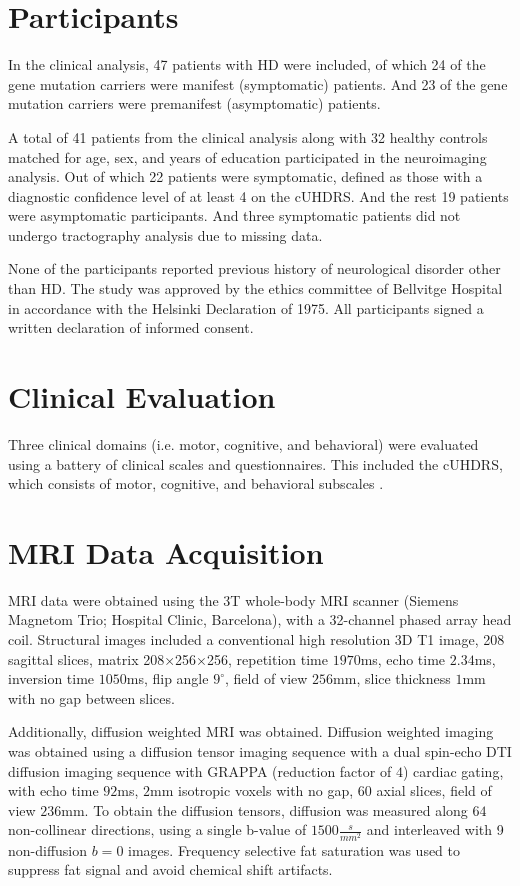 \label{sec:previous}

\section{Participants}

In the clinical analysis, 47 patients with \ac{HD} were included, of which 24 of the gene mutation carriers were manifest (symptomatic) patients. And 23 of the gene mutation carriers were premanifest (asymptomatic) patients.\par
A total of 41 patients from the clinical analysis along with 32 healthy controls matched for age, sex, and years of education participated in the neuroimaging analysis. Out of which 22 patients were symptomatic, defined as those with a diagnostic confidence level of at least 4 on the \ac{cUHDRS}. And the rest 19 patients were asymptomatic participants. And three symptomatic patients did not undergo tractography analysis due to missing data.\par
None of the participants reported previous history of neurological disorder other than \ac{HD}. The study was approved by the ethics committee of Bellvitge Hospital in accordance with the Helsinki Declaration of 1975. All participants signed a written declaration of informed consent.

\section{Clinical Evaluation}

Three clinical domains (i.e. motor, cognitive, and behavioral) were evaluated using a battery of clinical scales and questionnaires. This included the \ac{cUHDRS}, which consists of motor, cognitive, and behavioral subscales \cite{uhdrs}.

\section{MRI Data Acquisition}

\ac{MRI} data were obtained using the 3T whole-body MRI scanner (Siemens Magnetom Trio; Hospital Clinic, Barcelona), with a 32-channel phased array head coil. Structural images included a conventional high resolution 3D T1 image, 208 sagittal slices, matrix 208×256×256, repetition time $1970$ms, echo time $2.34$ms, inversion time $1050$ms, flip angle $9^{\circ}$, field of view $256$mm, slice thickness $1$mm with no gap between slices.\par
Additionally, diffusion weighted \ac{MRI} was obtained. Diffusion weighted imaging was obtained using a diffusion tensor imaging sequence with a dual spin-echo \ac{DTI} diffusion imaging sequence with GRAPPA (reduction factor of $4$) cardiac gating, with echo time $92$ms, $2$mm isotropic voxels with no gap, $60$ axial slices, field of view $236$mm. To obtain the diffusion tensors, diffusion was measured along $64$ non-collinear directions, using a single b-value of $1500\frac{s}{mm^2}$ and interleaved with 9 non-diffusion $b=0$ images. Frequency selective fat saturation was used to suppress fat signal and avoid chemical shift artifacts.

